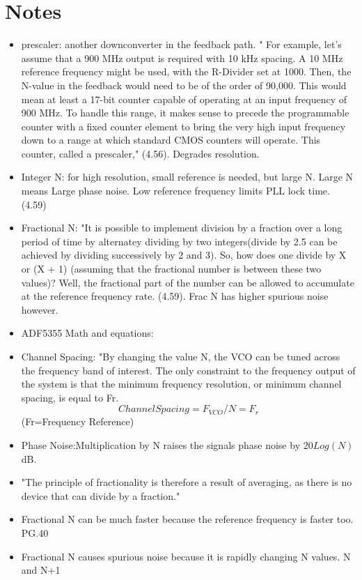 \section{Notes}
\begin{itemize}
	\item prescaler: another downconverter in the feedback path. " For example, let’s assume that a 900 MHz output is required with
	10 kHz spacing. A 10 MHz reference frequency might be used, with the R-Divider set at
	1000. Then, the N-value in the feedback would need to be of the order of 90,000. This
	would mean at least a 17-bit counter capable of operating at an input frequency of
	900 MHz.
	To handle this range, it makes sense to precede the programmable counter with a fixed
	counter element to bring the very high input frequency down to a range at which standard
	CMOS counters will operate. This counter, called a prescaler," \cite{RF_IFCircuits}(4.56). Degrades resolution.
	\item Integer N: for high resolution, small reference is needed, but large N. Large N means Large phase noise. Low reference frequency limits PLL lock time. \cite{RF_IFCircuits} (4.59)
	\item Fractional N: "It is possible to implement division by a fraction over a long period of time by alternatey dividing by two integers(divide by 2.5 can be achieved by dividing
	successively by 2 and 3). So, how does one divide by X or (X + 1) (assuming that the
	fractional number is between these two values)? Well, the fractional part of the number
	can be allowed to accumulate at the reference frequency rate. \cite{RF_IFCircuits}(4.59). Frac N has higher spurious noise however.
	\item ADF5355 Math and equations: \cite{ADF5355}
	\item Channel Spacing: "By changing the value N, the VCO can be
	tuned across the frequency band of interest. The only constraint to the frequency output
	of the system is that the minimum frequency resolution, or minimum channel spacing, is
	equal to Fr. $$Channel Spacing=F_{VCO}/N=F_r$$(Fr=Frequency Reference) \cite{FracVsInt}
	\item Phase Noise:Multiplication by N raises the signals phase noise by $20Log(N)$ dB. \cite{FracVsInt}
	\item "The principle of fractionality is
	therefore a result of averaging, as there is no device that can divide by a fraction." \cite{FracVsInt}
	\item Fractional N can be much faster because the reference frequency is faster too. \cite{FracVsInt} PG.40
	\item Fractional N causes spurious noise because it is rapidly changing N values. N and N+1
\end{itemize}